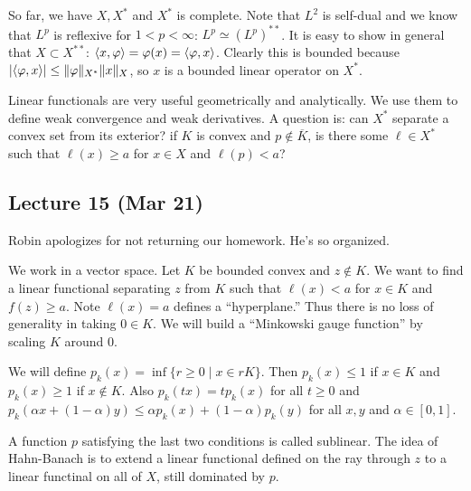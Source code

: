 \documentclass[10pt, twoside]{article}
\begin{document}
    So far, we have $X, X^*$ and $X^*$ is complete. Note that $L^2$ is self-dual and we know that $L^p$ is reflexive for $1 < p < \infty$: $L^p \simeq (L^p)^{**}$. It is easy to show in general that $X \subset X^{**}$: $\langle x,\varphi\rangle = \varphi(x) = \langle\varphi, x\rangle$. Clearly this is bounded because $\lvert\langle\varphi,x\rangle\rvert \leq \lVert\varphi\rVert_{X^*} \lVert x\rVert_X$, so $x$ is a bounded linear operator on $X^*$.

    Linear functionals are very useful geometrically and analytically. We use them to define weak convergence and weak derivatives. A question is: can $X^*$ separate a convex set from its exterior? if $K$ is convex and $p \not\in \overline{K}$, is there some $\ell \in X^*$ such that $\ell(x) \geq a$ for $x \in X$ and $\ell(p) < a$?

    \subsection{Lecture 15 (Mar 21)}

    Robin apologizes for not returning our homework. He's so organized.
    
    We work in a vector space. Let $K$ be bounded convex and $z \notin K$. We want to find a linear functional separating $z$ from $K$ such that $\ell(x) < a$ for $x \in K$ and $f(z) \geq a$. Note $\ell(x) = a$ defines a ``hyperplane.'' Thus there is no loss of generality in taking $0 \in K$. We will build a ``Minkowski gauge function'' by scaling $K$ around $0$. 
    
    We will define $p_k(x) = \inf \{ r \geq 0 \mid x \in rK\}$. Then $p_k(x) \leq 1$ if $x \in K$ and $p_k(x) \geq 1$ if $x \notin K$. Also $p_k(tx) = tp_k(x)$ for all $t \geq 0$ and $p_k(\alpha x + (1-\alpha)y) \leq \alpha p_k(x) + (1-\alpha)p_k(y)$ for all $x,y$ and $\alpha \in [0,1]$.

    A function $p$ satisfying the last two conditions is called sublinear. The idea of Hahn-Banach is to extend a linear functional defined on the ray through $z$ to a linear functinal on all of $X$, still dominated by $p$.
\end{document}
